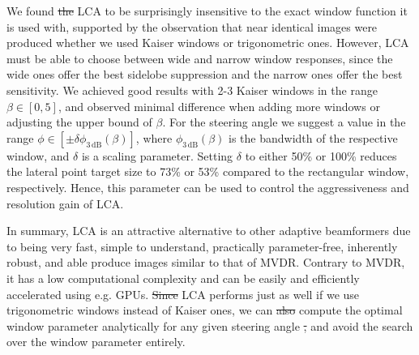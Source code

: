 \documentclass[10pt,journal,draftclsnofoot,onecolumn]{IEEEtran}
\newcommand\1{\vec 1}
\providecommand{\DIFadd}[1]{{\protect\color{blue}\uwave{#1}}} %
\providecommand{\DIFdel}[1]{{\protect\color{red}\sout{#1}}}                      %
\providecommand{\DIFaddbegin}{} %
\providecommand{\DIFaddend}{} %
\providecommand{\DIFdelbegin}{} %
\providecommand{\DIFdelend}{} %
\begin{document}
We found \DIFdelbegin \DIFdel{the }\DIFdelend LCA to be surprisingly insensitive to the exact window function it is used with, supported by the observation that near identical images were produced whether we used Kaiser windows or trigonometric ones. However, LCA must be able to choose between wide and narrow window responses, since the wide ones offer the best sidelobe suppression and the narrow ones offer the best sensitivity. We achieved good results with 2-3 Kaiser windows in the range $\beta\in[0,5]$, and observed minimal difference when adding more windows or adjusting the upper bound of $\beta$. For the steering angle we suggest a value in the range $\phi\in[\pm\delta\phi_\mathrm{3\,dB}(\beta)]$, where $\phi_\mathrm{3\,dB}(\beta)$ is the bandwidth of the respective window, and $\delta$ is a scaling parameter. Setting $\delta$ to either 50\% or 100\% reduces the lateral point target size to 73\% or 53\% compared to the rectangular window, respectively. Hence, this parameter can be used to control the aggressiveness and resolution gain of LCA.

In summary, LCA is an attractive alternative to other adaptive beamformers due to being very fast, simple to understand, practically parameter-free, inherently robust, and able \DIFaddbegin \DIFadd{to }\DIFaddend produce images similar to that of MVDR. Contrary to MVDR, it has a low computational complexity and can be easily and efficiently accelerated using e.g. GPUs. \DIFdelbegin \DIFdel{Since }\DIFdelend \DIFaddbegin \DIFadd{Also, since }\DIFaddend LCA performs just as well if we use trigonometric windows instead of Kaiser ones, we can \DIFdelbegin \DIFdel{also }\DIFdelend compute the optimal window parameter analytically for any given steering angle \DIFdelbegin \DIFdel{, }\DIFdelend and avoid the search over the window parameter entirely.




% 
\end{document}
